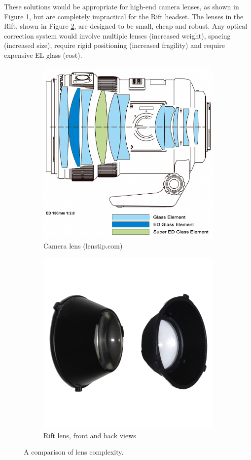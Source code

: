 \documentclass[MSc,paper=a4,pagesize=auto]{icldt}
\begin{document}
These solutions would be appropriate for high-end camera lenses, as shown in Figure \ref{fig:camera_lens}, but are completely impractical for the Rift headset. The lenses in the Rift, shown in Figure \ref{fig:rift_lens}, are designed to be small, cheap and robust. Any optical correction system would involve multiple lenses (increased weight), spacing (increased size), require rigid positioning (increased fragility) and require expensive EL glass (cost).

\begin{figure}[htbp!]
\centering
\begin{subfigure}{0.5\textwidth}
    \centering
    \includegraphics[width=0.5\linewidth]{resources/camera_lens}
    \caption{Camera lens (lenstip.com)}
	\label{fig:camera_lens}
\end{subfigure}%
\centering
\begin{subfigure}{0.5\textwidth}
    \centering
    \includegraphics[width=0.5\linewidth]{resources/rift_lenses}
    \caption{Rift lens, front and back views}
	\label{fig:rift_lens}
\end{subfigure}    
    \caption{A comparison of lens complexity.}
    \label{fig:lens_comparison}
\end{figure}
\end{document}
